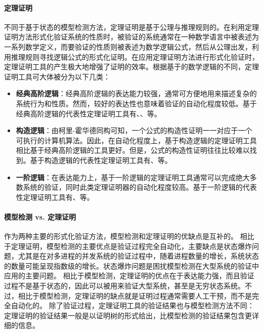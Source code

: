 \paragraph{定理证明}
不同于基于状态的模型检测方法，定理证明\cite{Fitting96,Loveland78,Burel09}是基于公理与推理规则的。在利用定理证明方法形式化验证系统的性质时，被验证的系统通常在一种数学语言中被表述为一系列数学定义，而要验证的性质则被表述为数学逻辑公式，然后从公理出发，利用推理规则寻找逻辑公式的形式化证明。在应用定理证明方法进行形式化验证时，定理证明工具的产生极大地增强了证明的效率。根据基于的数学逻辑的不同，定理证明工具可大体被分为以下几类：
\begin{itemize}

	\item \textbf{经典高阶逻辑}：经典高阶逻辑的表达能力较强，通常可方便地用来描述复杂的系统行为和性质。然而，较好的表达性也意味着验证的自动化程度较低。基于经典高阶逻辑的代表性定理证明工具有\cite{Gordon00}、\cite{Nipkow12}、\cite{OwreRS92}等。
	\item \textbf{构造逻辑}：由柯里-霍华德同构\cite{PoernomoWC05}可知，一个公式的构造性证明一一对应于一个可执行的计算机算法。因此，在自动化程度上，基于构造逻辑的定理证明工具相比基于经典高阶逻辑的工具更好。但是，公式的构造性证明往往比较难以找到。基于构造逻辑的代表性定理证明工具有\cite{BertotC04}、\cite{AllenCEKL00}等。
	\item \textbf{一阶逻辑}：在表达能力上，基于一阶逻辑的定理证明工具通常可以完成绝大多数系统的验证，同时此类定理证明器的自动化程度较高。基于一阶逻辑的代表性定理证明工具有\cite{KaufmannM08}、\cite{cs-LO-9301106}等。
\end{itemize}

\paragraph{模型检测 vs. 定理证明}
作为两种主要的形式化验证方法，模型检测和定理证明的优缺点是互补的。
相比于定理证明，模型检测的主要优点是验证过程完全自动化，主要缺点是状态爆炸问题，尤其是在对多进程的并发系统的验证过程中，随着进程数量的增长，系统状态的数量可能呈现指数级的增长。状态爆炸问题是困扰模型检测在大型系统的验证中应用的主要问题。
相比于模型检测，定理证明的优点在于表达能力强，而且验证过程不是基于状态的，因此可以被用来验证大型系统，甚至是无穷状态系统。不过，相比于模型检测，定理证明的缺点就是证明过程通常需要人工干预，而不是完全自动化的。
除了验证过程，定理证明工具的验证结果也与模型检测方法不同：定理证明的验证结果一般是以证明树的形式给出，比模型检测的验证结果包含更详细的信息。



